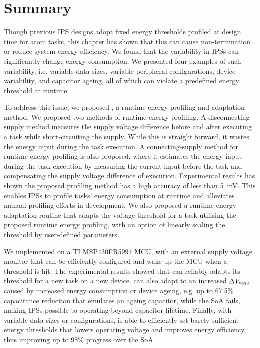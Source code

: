 \section{Summary} \label{sec:c5_summary}

Though previous IPS designs adopt fixed energy thresholds profiled at design time for atom tasks, this chapter has shown that this can cause non-termination or reduce system energy efficiency. 
We found that the variability in IPSs can significantly change energy consumption.
We presented four examples of such variability, i.e. variable data sizes, variable peripheral configurations, device variability, and capacitor ageing, all of which can violate a predefined energy threshold at runtime. 

To address this issue, we proposed \nn{}, a runtime energy profiling and adaptation method. 
We proposed two methods of runtime energy profiling. 
A disconnecting-supply method measures the supply voltage difference before and after executing a task while short-circuiting the supply. 
While this is straight forward, it wastes the energy input during the task execution.
A connecting-supply method for runtime energy profiling is also proposed, where it estimates the energy input during the task execution by measuring the current input before the task and compensating the supply voltage difference of execution. 
Experimental results has shown the proposed profiling method has a high accuracy of less than \SI{5}{\milli\volt}.
This enables IPSs to profile tasks' energy consumption at runtime and alleviates manual profiling efforts in development.
We also proposed a runtime energy adaptation routine that adapts the voltage threshold for a task utilising the proposed runtime energy profiling, with an option of linearly scaling the threshold by user-defined parameters. 

We implemented \nn{} on a TI MSP430FR5994 MCU, with an external supply voltage monitor that can be efficiently configured and wake up the MCU when a threshold is hit. 
The experimental results showed that \nn{} can reliably adapts its threshold for a new task on a new device. 
\nn{} can also adapt to an increased $\Delta V_{\text{task}}$ caused by increased energy consumption or device ageing, e.g. up to 67.5\% capacitance reduction that emulates an ageing capacitor, while the SoA fails, making IPSs possible to operating beyond capacitor lifetime. 
Finally, with variable data sizes or configurations, \nn{} is able to efficiently set barely sufficient energy thresholds that lowers operating voltage and improves energy efficiency, thus improving up to 98\% progress over the SoA. 

